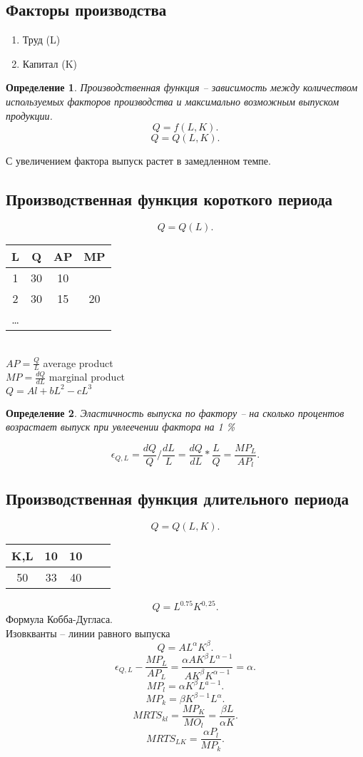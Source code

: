 \documentclass[14pt]{extarticle}
\newtheorem{definition}{Определение}
\begin{document}
\subsection{Факторы производства}
\begin{enumerate}
	\item Труд (L)
	\item Капитал (K)
\end{enumerate}
\begin{definition}
	Производственная функция -- зависимость между количеством используемых факторов производства и максимально возможным выпуском продукции.
	\[
		Q = f(L,K)
		.\]
	\[
		Q = Q(L,K)
		.\]
\end{definition}
С увеличением фактора выпуск растет в замедленном  темпе.
\subsection{Производственная функция короткого периода}
\[
	Q = Q(L)
	.\]
\begin{tabular}{c|c|c|c}
	L & Q  & AP & MP \\
	\hline
	1 & 30 & 10 &    \\
	\hline
	2 & 30 & 15 & 20 \\
	\dots            \\
\end{tabular}\\
$AP = \frac{Q}{L}$ average product \\
$MP = \frac{dQ}{dL}$ marginal product\\
$Q = Al + bL^2 - c L^3$
\begin{definition}
	Эластичность выпуска по фактору -- на сколько процентов возрастает выпуск при увлеечении фактора на 1 \%
\end{definition}
\[
	\epsilon_{Q,L} =  \frac{dQ}{Q} / \frac{dL}{L} = \frac{d Q}{d L} * \frac{L}{Q} = \frac{MP_{L}}{AP_{l}}
	.\]
\subsection{Производственная функция длительного периода}
\[
	Q = Q(L,K)
	.\]
\begin{tabular}{|c|c|c|c|c|}
	K,L & 10 & 10 \\
	\hline
	50  & 33 & 40
\end{tabular}
\[
	Q = L^{0.75} K^{0,25}
	.\]
Формула Кобба-Дугласа.\\
Изовкванты -- линии равного выпуска
\[
	Q = AL^{\alpha} K^{\beta}
	.\]
\[
	\epsilon_{Q,L} - \frac{MP_{L}}{AP_{L}} = \frac{\alpha AK^{\beta} L^{\alpha -1}}{AK^{\beta} K^{\alpha - 1}} = \alpha
	.\]
\[
	MP_{l} = \alpha K^{\beta} L^{a-1}
	.\]
\[
	MP_{k} = \beta K^{\beta -1} L^{\alpha}
	.\]
\[
	MRTS _{kl} = \frac{MP_{K}}{MO_{l}} = \frac{\beta L}{\alpha K}
	.\]
\[
	MRTS_{LK} =\frac{ \alpha P_{l}}{M P_{k}}
	.\]
\end{document}
